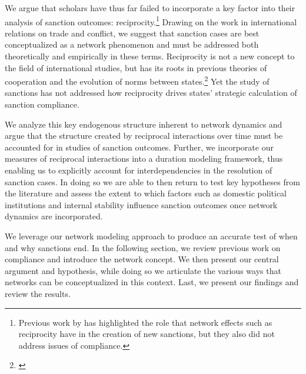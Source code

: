 We argue that scholars have thus far failed to incorporate a key factor into their analysis of sanction outcomes: reciprocity.\footnote{Previous work by \cite{cranmer2014reciprocity} has highlighted the role that network effects such as reciprocity have in the creation of new sanctions, but they also did not address issues of compliance.} Drawing on the work in international relations on trade and conflict, we suggest that sanction cases are best conceptualized as a network phenomenon and must be addressed both theoretically and empirically in these terms. Reciprocity is not a new concept to the field of international studies, but has its roots in previous theories of cooperation and the evolution of norms between states.\footnote{\cite{richardsonai:1960,choucri:north:1972,goldstein1991reciprocity,rajmaira1990evolving,ward1992reciprocity}} Yet the study of sanctions has not addressed how reciprocity drives  states' strategic calculation of sanction compliance. 

We analyze this key endogenous structure inherent to network dynamics and argue that the structure created by reciprocal interactions over time must be accounted for in studies of sanction outcomes. Further, we incorporate our measures of reciprocal interactions into a duration modeling framework, thus enabling us to explicitly account for interdependencies in the resolution of sanction cases. In doing so we are able to then return to test key hypotheses from the literature and assess the extent to which factors such as domestic political institutions and internal stability influence sanction outcomes once network dynamics are incorporated.  

We leverage our network modeling approach to produce an accurate test of when and why sanctions end. In the following section, we review previous work on compliance and introduce the network concept. We then present our central argument and hypothesis, while doing so we articulate the various ways that networks can be conceptualized in this context. Last, we present our findings and review the results.
